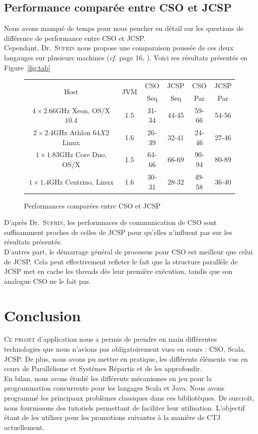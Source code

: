 \documentclass[a4paper,11pt,french]{report}
\begin{document}
\section{Performance comparée entre CSO et JCSP}
Nous avons manqué de temps pour nous pencher en détail sur les questions de différence de performance entre CSO et JCSP.\\
Cependant, Dr.\ \textsc{Sufrin} nous propose une comparaison poussée de ces deux langauges sur plusieurs machines (\emph{cf.} page 16, \cite{cpa2008-cso}). Voici ses résultats présentés en Figure~\vref{fig:tab}
\begin{figure}
\centering
\begin{tabular}{|cc||c|c|c|c|}
\hline \multirow{2}{1cm}{Host} & \multirow{2}{1cm}{JVM} & CSO & JCSP & CSO & JCSP \\ 
  &   & Seq & Seq & Par & Par \\ 
\hline\hline $4 \times 2.66$GHz Xeon, OS/X $10.4$ 
 & 1.5 & 31-34 & 44-45 & 59-66 & 54-56 \\ 
\hline $2 \times 2.4$GHz Athlon $64X2$ Linux 
 & 1.6 & 26-39 & 32-41 & 24-46 & 27-46 \\ 
\hline $1 \times 1.83$GHz Core Duo, OS/X 
 & 1.5 & 64-66 & 66-69 & 90-94 & 80-89 \\ 
\hline $1 \times 1.4$GHz Centrino, Linux 
 & 1.6 & 30-31 & 28-32 & 49-58 & 36-40 \\ 
\hline 
\end{tabular}
\caption{Performances comparées entre CSO et JCSP}
\label{fig:tab} 
\end{figure}

D'après Dr.\ \textsc{Sufrin}, les performnaces de communication de CSO sont suffisamment proches de celles de JCSP pour qu'elles n'influent pas sur les résultats présentés.\\
D'autres part, le démarrage général de processus pour CSO est meilleur que celui de JCSP. Cela peut effectivement refleter le fait que la structure parallèle de JCSP met en cache les threads dès leur première exécution, tandis que son analogue CSO ne le fait pas.

\chapter{Conclusion}

\lettrine{C}{e projet} d'application nous a permis de prendre en main différentes technologies que nous n'avions pas obligatoirement vues en cours : CSO, Scala, JCSP. De plus, nous avons pu mettre en pratique, les différents éléments vus en cours de Parallélisme et Systèmes Répartis et de les approfondir.\\
En bilan, nous avons étudié les différents mécanismes en jeu pour la programmation concurrente pour les langages Scala et Java. Nous avons programmé les principaux problèmes classiques dans ces bibliotèques. De surcroît, nous fournissons des tutoriels permettant de faciliter leur utilisation. L'objectif étant de les utiliser pour les promotions suivantes à la manière de CTJ actuellement.\\
\end{document}
